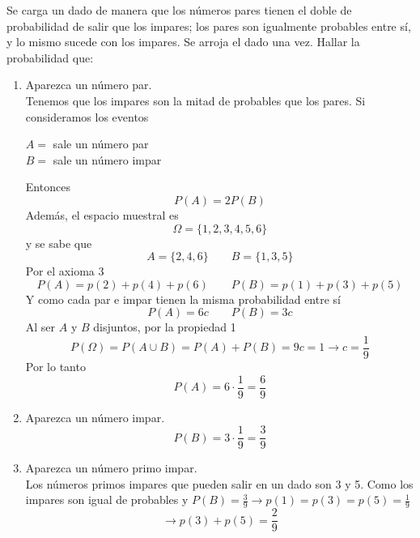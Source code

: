 \item Se carga un dado de manera que los números pares tienen el doble de probabilidad de salir que los impares; los pares son igualmente probables entre sí, y lo mismo sucede con los impares. Se arroja el dado una vez. Hallar la probabilidad que:
    \begin{enumerate}
        \item Aparezca un número par.\e\\
            Tenemos que los impares son la mitad de probables que los pares. Si consideramos los eventos
            \begin{center}
                $A=$ sale un número par\\
                $B=$ sale un número impar
            \end{center}
            Entonces\[P(A)=2P(B)\]
            Además, el espacio muestral es\[\Omega=\{1,2,3,4,5,6\}\]
            y se sabe que\[A=\{2,4,6\}\qquad B=\{1,3,5\}\]
            Por el axioma 3\[P(A)=p(2)+p(4)+p(6)\qquad P(B)=p(1)+p(3)+p(5)\]
            Y como cada par e impar tienen la misma probabilidad entre sí\[P(A)=6c\qquad P(B)=3c\]
            Al ser $A$ y $B$ disjuntos, por la propiedad 1\[P(\Omega)=P(A\cup B)=P(A)+P(B)=9c=1\to c=\frac{1}{9}\]
            Por lo tanto\[P(A)=6\cdot\frac{1}{9}=\frac{6}{9}\]
        \item Aparezca un número impar.
            \[P(B)=3\cdot\frac{1}{9}=\frac{3}{9}\]
        \item Aparezca un número primo impar.\e\\
            Los números primos impares que pueden salir en un dado son 3 y 5. Como los impares son igual de probables y $P(B)=\frac{3}{9}\to p(1)=p(3)=p(5)=\frac{1}{9}$\[\to p(3)+p(5)=\frac{2}{9}\]
    \end{enumerate}